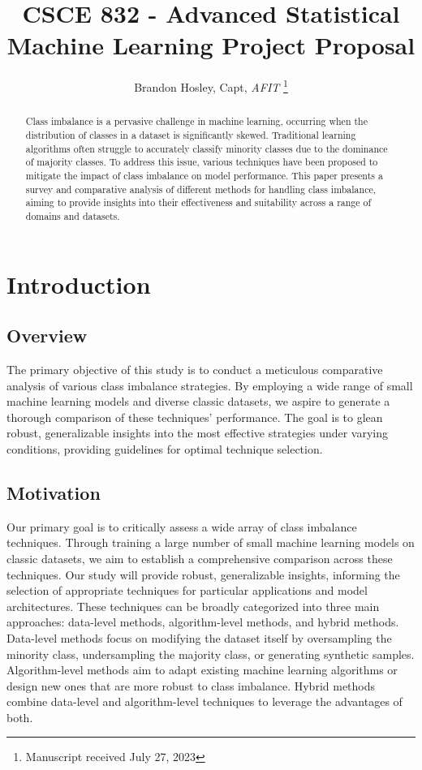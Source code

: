 \documentclass[journal]{IEEEtran}
\title{CSCE 832 - Advanced Statistical Machine Learning Project Proposal}
\author{Brandon Hosley, Capt, \textit{AFIT}%
	\thanks{Manuscript received July 27, 2023%
}}
\begin{document}
	
	\maketitle
	
	
	\begin{abstract}
		Class imbalance is a pervasive challenge in machine learning, occurring when the distribution of classes in a dataset is significantly skewed. Traditional learning algorithms often struggle to accurately classify minority classes due to the dominance of majority classes. To address this issue, various techniques have been proposed to mitigate the impact of class imbalance on model performance. This paper presents a survey and comparative analysis of different methods for handling class imbalance, aiming to provide insights into their effectiveness and suitability across a range of domains and datasets.
	\end{abstract}
	
	
	\section{Introduction}
	\subsection{Overview}
		The primary objective of this study is to conduct a meticulous comparative analysis of various class imbalance strategies. By employing a wide range of small machine learning models and diverse classic datasets, we aspire to generate a thorough comparison of these techniques' performance. The goal is to glean robust, generalizable insights into the most effective strategies under varying conditions, providing guidelines for optimal technique selection.
		
	
	\subsection{Motivation}
		Our primary goal is to critically assess a wide array of class imbalance techniques. Through training a large number of small machine learning models on classic datasets, we aim to establish a comprehensive comparison across these techniques. Our study will provide robust, generalizable insights, informing the selection of appropriate techniques for particular applications and model architectures.
		These techniques can be broadly categorized into three main approaches: data-level methods, algorithm-level methods, and hybrid methods. \cite{johnson2019}
		Data-level methods focus on modifying the dataset itself by oversampling the minority class, undersampling the majority class, or generating synthetic samples. Algorithm-level methods aim to adapt existing machine learning algorithms or design new ones that are more robust to class imbalance. Hybrid methods combine data-level and algorithm-level techniques to leverage the advantages of both.
\end{document}

